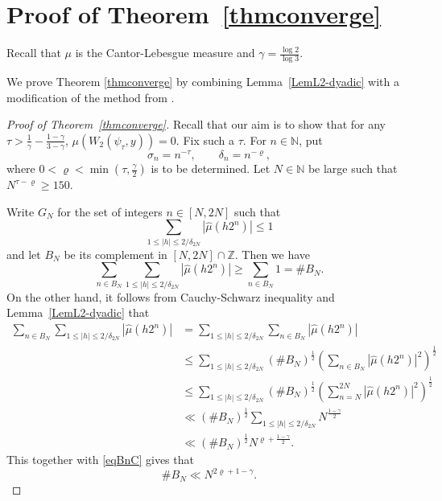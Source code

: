 \documentclass[10pt,a4paper]{amsart}
\numberwithin{equation}{section} %
\begin{document}
\section{Proof of Theorem~\ref{thmconverge}}\label{sec:thmconverge}


Recall that $\mu$  is the Cantor-Lebesgue measure and $\gamma=\frac{\log 2}{\log 3}$. 

We prove Theorem \ref{thmconverge} by combining Lemma~\ref{LemL2-dyadic} with a modification of the method from \cite[Theorem 2]{ABCY23A}.

\begin{proof}[Proof of Theorem~\ref{thmconverge}]
Recall that our aim is to show that for any  $\tau>\frac{1}{\gamma}-\frac{1-\gamma}{3-\gamma}$, \(\mu (W_{2}(\psi_{\tau},y))= 0\). Fix such a  $\tau$. For \(n\in  \mathbb{N}\), put
	\[
	\sigma_{n} = n^{-\tau},\qquad \delta_{n} = n^{-\varrho},
	\]
	where $0<\varrho<\min(\tau,\frac{\gamma}{2})$ is to be determined. Let \(N\in \mathbb{N}\) be large such that $N^{\tau-\varrho}\geq150$. 
	
	
	Write \(G_{N}\) for the set of integers \(n\in [N,2N]\) such that
	\[
	\sum_{1\leq |h|\leq 2/\delta_{2N}}|\widehat{\mu} (h2^{n})|\leq1
	\]
	and let \(B_{N}\) be its complement in \([N,2N]\cap \mathbb{Z}\). Then we have \begin{equation}\label{eqBnC}
		\sum_{n\in B_{N}}\sum_{1\leq |h|\leq 2/\delta_{2N}}|\widehat{\mu} (h2^{n})|\geq\sum_{n\in B_{N}}1=\#B_{N}.
	\end{equation}
On the other hand, it follows from Cauchy-Schwarz inequality and Lemma~\ref{LemL2-dyadic} that
	\begin{align*}
		\sum_{n\in B_{N}}\sum_{1\leq |h|\leq 2/\delta_{2N}}|\widehat{\mu} (h2^{n})|&=\sum_{1\leq |h|\leq 2/\delta_{2N}}\sum_{n\in B_{N}}|\widehat{\mu}(h2^{n})|\\
        &\leq\sum_{1\leq |h|\leq 2/\delta_{2N}}(\#B_{N})^{\frac{1}{2}}\left(\sum_{n\in B_{N}}|\widehat{\mu}(h2^{n})|^{2}\right)^{\frac{1}{2}} \\
		&\leq\sum_{1\leq |h|\leq 2/\delta_{2N}}(\#B_{N})^{\frac{1}{2}}\left(\sum_{n=N}^{2N}|\widehat{\mu}(h2^{n})|^{2}\right)^{\frac{1}{2}} \\
&\ll(\#B_{N})^{\frac{1}{2}}\sum_{1\leq |h|\leq 2/\delta_{2N}}N^{\frac{1-\gamma}{2}} \\ &\ll(\#B_{N})^{\frac{1}{2}}N^{\varrho+\frac{1-\gamma}{2}}.
	\end{align*}
	This together with \eqref{eqBnC} gives that
	$$ \#B_{N}\ll N^{2\varrho+1-\gamma}.$$


\end{proof}
\end{document}
